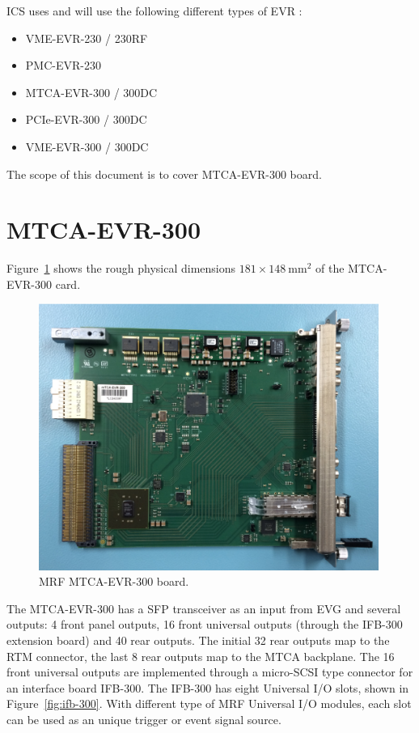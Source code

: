 \documentclass[11pt
  , a4paper
  , article
  , oneside
  , showtrims
]{memoir}
\begin{document}
ICS uses and will use the following different types of EVR :
\begin{itemize}
\item VME-EVR-230 / 230RF
\item PMC-EVR-230
\item MTCA-EVR-300 / 300DC
\item PCIe-EVR-300 / 300DC
\item VME-EVR-300 / 300DC
\end{itemize}

The scope of this document is to cover MTCA-EVR-300 board.


\section{MTCA-EVR-300}
Figure~\ref{fig:mtca-evr300} shows the rough physical dimensions $181\times 148~\mathrm{mm}{}^2$ of the MTCA-EVR-300 card.

\begin{figure}[!htb]
  \centering
  \includegraphics[width=0.99\textwidth]{./pictures/mtca_evr_300.eps}
  \caption{
    MRF MTCA-EVR-300 board.
  }
  \label{fig:mtca-evr300}   
\end{figure}


The MTCA-EVR-300  has a SFP transceiver as an input from EVG and several outputs: 4 front panel outputs, 16 front universal outputs (through the IFB-300 extension board) and 40 rear outputs. The initial 32 rear outputs map to the RTM connector, the last 8 rear outputs map to the MTCA backplane. The 16 front universal outputs are implemented through a micro-SCSI type connector for an interface board IFB-300. The IFB-300 has eight Universal I/O slots, shown in Figure~\ref{fig:ifb-300}. With different type of MRF Universal I/O modules, each slot can be used as an unique trigger or event signal source.
\end{document}
